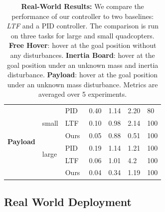 \begin{table}[t]
\begin{tabular}{lllllll}
\multicolumn{1}{c}{\multirow{6}{*}{\textbf{Payload}}} & \multirow{3}{*}{small} & PID & 0.40 & 1.14 & 2.20 & 80 \\ %
&  & LTF~\cite{LTF} & 0.10 & 0.98 & 2.14 & 100 \\
\multicolumn{1}{c}{} &  & Ours & 0.05 & 0.88 & 0.51 & 100 \\ \cline{2-7} 
\multicolumn{1}{c}{} & \multirow{2}{*}{large} & PID & 0.19 & 1.14 & 1.21 & 100 \\ %
&  & LTF~\cite{LTF} & 0.06 & 1.01 & 4.2 & 100 \\
\multicolumn{1}{c}{} &  & Ours & 0.04 & 0.34 & 1.19 & 100 \\
\bottomrule
\end{tabular}
\vspace{2ex}
\caption{\label{tab:rw_results} \textbf{Real-World  Results:} We compare the performance of our controller to two baselines: \emph{LTF} and a PID controller. The comparison is run on three tasks for large and small quadcopters. \textbf{Free Hover}: hover at the goal position without any disturbances. \textbf{Inertia Board}: hover at the goal position under an unknown mass and inertia disturbance. \textbf{Payload}: hover at the goal position under an unknown mass disturbance.  
Metrics are averaged over 5 experiments.}
\end{table}



\subsection{Real World Deployment}


